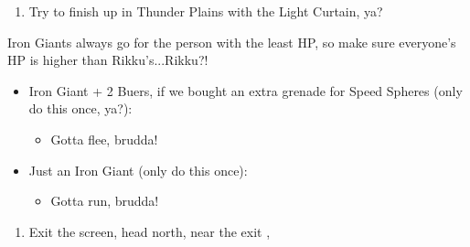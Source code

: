 \begin{enumerate}[resume]
    \item Try to finish up in Thunder Plains with the Light Curtain, ya?
\end{enumerate}
\begin{encounters}
    Iron Giants always go for the person with the least HP, so make sure everyone's HP is higher than Rikku's...Rikku?!
    \begin{itemize}
        \item Iron Giant + 2 Buers, if we bought an extra grenade for Speed Spheres (only do this once, ya?):
        \begin{itemize}
            \switch{\tidus}{\rikku}
            \rikkuf Rikku...Rikku?! throws a Grenade, ya?
            \wakkaf Wakka defends, gotta protect Yuna!
            \auronf Auron defends too, ya?
            \enemyf They attack Rikku...Rikku?!
            \switch{\wakka}{\tidus}
            \item Gotta flee, brudda!
        \end{itemize}
        \item Just an Iron Giant (only do this once):
        \begin{itemize}
            \tidusf Tidus defends, ya?
            \switch{\wakka}{\rikku}
            \rikkuf Rikku...Rikku?! tries to steal a Light Curtain, ya?
            \auronf Auron defends, like a blitzball goalie!
            \enemyf Attacks Rikku...Rikku?!
            \item Gotta run, brudda!
        \end{itemize}
    \end{itemize}
\end{encounters}
\begin{enumerate}[resume]
    \item Exit the screen, head north, near the exit \sd, \cs[3:10]
\end{enumerate}